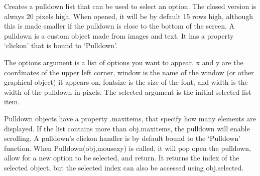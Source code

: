 \documentclass[letterpaper,10pt,english]{sphinxmanual}
\begin{document}
\sphinxAtStartPar
{}

\sphinxAtStartPar
Creates a pulldown list that can be used to select an option. The closed version is always 20 pixels high. When opened, it will be by default 15 rows high, although this is made smaller if the pulldown is close to the bottom of the screen. A pulldown is a custom object made from images and text. It has a property ‘clickon’ that is bound to ‘Pulldown’.

\sphinxAtStartPar
{}

\begin{sphinxVerbatim}[commandchars=\\\{\}]
\end{sphinxVerbatim}

\sphinxAtStartPar
{}

\sphinxAtStartPar
The options argument is a list of options you want to appear. x and y are the coordinates of the upper left corner, window is the name of the window (or other graphical object) it appears on, fontsize is the size of the font, and width is the width of the pulldown in pixels. The selected argument is the initial selected list item.

\sphinxAtStartPar
Pulldown objects have a property .maxitems, that specify how many elements are displayed. If the list contains more than obj.maxitems, the pulldown will enable scrolling. A pulldown’s click\sphinxhyphen{}on handler is by default bound to the ‘Pulldown’ function. When Pulldown(obj,mousexy) is called, it will pop open the pulldown, allow for a new option to be selected, and return. It returns the index of the selected object, but the selected index can also be accessed using obj.selected.

\sphinxAtStartPar
{}
\end{document}
